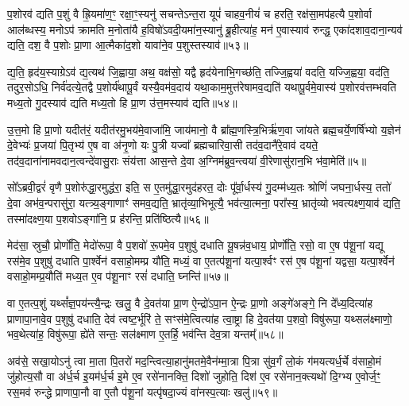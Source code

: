 प॒शोरव॑ द्यति प॒शुं वै ह्रि॒यमा॑ण॒ꣳ॒ रक्षा॒ꣳ॒स्यनु॑ सचन्ते\-ऽन्त॒रा यूपं॑ चाहव॒नीयं॑ च हरति॒ रक्ष॑सा॒मप॑हत्यै प॒शोर्वा आल॑ब्धस्य॒ मनो\-ऽप॑ क्रामति म॒नोता॑यै ह॒विषो॑\-ऽवदी॒यमा॑न॒स्यानु॑ ब्रू॒हीत्या॑ह॒ मन॑ ए॒वास्याव॑ रुन्द्ध॒ एका॑दशाव॒दाना॒न्यव॑ द्यति॒ दश॒ वै प॒शोः प्रा॒णा आ॒त्मैका॑द॒शो यावा॑ने॒व प॒शुस्तस्याव॑॥५३॥

द्य॒ति॒ हृद॑य॒स्याग्रे\-ऽव॑ द्य॒त्यथ॑ जि॒ह्वाया॒ अथ॒ वक्ष॑सो॒ यद्वै हृद॑येनाभि॒गच्छ॑ति॒ तज्जि॒ह्वया॑ वदति॒ यज्जि॒ह्वया॒ वद॑ति॒ तदुर॒सो\-ऽधि॒ निर्व॑दत्ये॒तद्वै प॒शोर्य॑थापू॒र्वं यस्यै॒वम॑व॒दाय॑ यथा॒काम॒मुत्त॑रेषामव॒द्यति॑ यथापू॒र्वमे॒वास्य॑ प॒शोरव॑त्तम्भवति मध्य॒तो गु॒दस्याव॑ द्यति मध्य॒तो हि प्रा॒ण उ॑त्त॒मस्याव॑ द्यति॥५४॥

उ॒त्त॒मो हि प्रा॒णो यदीत॑रं॒ यदीत॑रमु॒भय॑मे॒वाजा॑मि॒ जाय॑मानो॒ वै ब्रा᳚ह्म॒णस्त्रि॒भिर्\mbox{}ऋ॑ण॒वा जा॑यते ब्रह्म॒चर्ये॒णर्\mbox{}षि॑भ्यो य॒ज्ञेन॑ दे॒वेभ्यः॑ प्र॒जया॑ पि॒तृभ्य॑ ए॒ष वा अ॑नृ॒णो यः पु॒त्री यज्वा᳚ ब्रह्मचारिवा॒सी तद॑व॒दानै॑रे॒वाव॑ दयते॒ तद॑व॒दाना॑नामवदान॒त्वन्दे॑वासु॒राः संय॑त्ता आस॒न्ते दे॒वा अ॒ग्निम॑ब्रुव॒न्त्वया॑ वी॒रेणासु॑रान॒भि भ॑वा॒मेति॑॥५॥

सो᳚\-ऽब्रवी॒द्वरं॑ वृणै प॒शोरु॑द्धा॒रमुद्ध॑रा॒ इति॒ स ए॒तमु॑द्धा॒रमुद॑हरत॒ दोः पू᳚र्वा॒र्धस्य॑ गु॒दम्म॑ध्य॒तः श्रोणिं॑ जघना॒र्धस्य॒ ततो॑ दे॒वा अभ॑व॒न्परासु॑रा॒ यत्त्र्य॒ङ्गाणाꣳ॑ समव॒द्यति॒ भ्रातृ॑व्या॒भिभूत्यै॒ भव॑त्या॒त्मना॒ परा᳚स्य॒ भ्रातृ॑व्यो भवत्यक्ष्ण॒याव॑ द्यति॒ तस्मा॑दक्ष्ण॒या प॒शवो\-ऽङ्गा॑नि॒ प्र ह॑रन्ति॒ प्रति॑ष्ठित्यै॥५६॥

{\anuvakamend[{ए॒तौ प॑शू॒नाꣳ समे॑धस्यै॒व तस्यावो᳚त्त॒मस्याव॑ द्य॒तीति॒ पञ्च॑चत्वारिꣳशच्च॥10॥}]}

मेद॑सा॒ स्रुचौ॒ प्रोर्णो॑ति॒ मेदो॑रूपा॒ वै प॒शवो॑ रू॒पमे॒व प॒शुषु॑ दधाति यू॒षन्न॑व॒धाय॒ प्रोर्णो॑ति॒ रसो॒ वा ए॒ष प॑शू॒नां यद्यू रस॑मे॒व प॒शुषु॑ दधाति पा॒र्श्वेन॑ वसाहो॒मम्प्र यौ॑ति॒ मध्यं॒ वा ए॒तत्प॑शू॒नां यत्पा॒र्श्वꣳ रस॑ ए॒ष प॑शू॒नां यद्वसा॒ यत्पा॒र्श्वेन॑ वसाहो॒मम्प्र॒यौति॑ मध्य॒त ए॒व प॑शू॒नाꣳ रसं॑ दधाति॒ घ्नन्ति॑॥५७॥

वा ए॒तत्प॒शुं यथ्सं᳚ज्ञ॒पय॑न्त्यै॒न्द्रः खलु॒ वै दे॒वत॑या प्रा॒ण ऐ॒न्द्रो॑\-ऽपा॒न ऐ॒न्द्रः प्रा॒णो अङ्गे॑अङ्गे॒ नि दे᳚ध्य॒दित्या॑ह प्राणापा॒नावे॒व प॒शुषु॑ दधाति॒ देव॑ त्वष्ट॒र्भूरि॑ ते॒ सꣳस॑मे॒त्वित्या॑ह त्वा॒ष्ट्रा हि दे॒वत॑या प॒शवो॒ विषु॑रूपा॒ यथ्सल॑क्ष्माणो॒ भव॒थेत्या॑ह॒ विषु॑रूपा॒ ह्ये॑ते सन्तः॒ सल॑क्ष्माण ए॒तर्\mbox{}हि॒ भव॑न्ति देव॒त्रा यन्तम्᳚॥५८॥

अव॑से॒ सखा॒यो\-ऽनु॑ त्वा मा॒ता पि॒तरो॑ मद॒न्त्वित्या॒हानु॑मतमे॒वैन॑म्मा॒त्रा पि॒त्रा सु॑व॒र्गं लो॒कं ग॑मयत्यर्ध॒र्चे व॑साहो॒मं जु॑होत्य॒सौ वा अ॑र्ध॒र्च इ॒यम॑र्ध॒र्च इ॒मे ए॒व रसे॑नानक्ति॒ दिशो॑ जुहोति॒ दिश॑ ए॒व रसे॑नान॒क्त्यथो॑ दि॒ग्भ्य ए॒वोर्ज॒ꣳ॒ रस॒मव॑ रुन्द्धे प्राणापा॒नौ वा ए॒तौ प॑शू॒नां यत्पृ॑षदा॒ज्यं वा॑नस्प॒त्याः खलु॑॥५९॥

